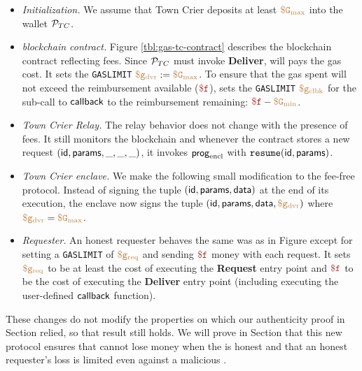 \begin{itemize}[leftmargin=1.5em]
  \item {\it Initialization.}
    We assume that Town Crier deposits at least $\tt {\color{brown} \$G_\text{max} }$ into the wallet ${\cal P}_{TC}$.

  \item {\it \tcs blockchain contract.}
    Figure \ref{tbl:gas-tc-contract} describes the \tcs blockchain contract reflecting fees.
    Since ${\cal P}_{TC}$ must invoke {\bf Deliver}, \tc will pays the gas cost.
    It sets the {\tt GASLIMIT} $\tt {\color{brown} \$g_\text{dvr} } := \tt {\color{brown} \$G_\text{max} }$.
    To ensure that the gas spent will not exceed the reimbursement available ($\fee$),
    \tcont sets the {\tt GASLIMIT} $\tt {\color{brown} \$g_\text{clbk} }$ for the sub-call to ${\sf callback}$ to the reimbursement remaining: $\fee - \constgasmin$.

  \item {\it Town Crier Relay.}
    The relay behavior does not change with the presence of fees.
    It still monitors the blockchain and whenever the contract \tcont stores a new request $({\sf id}, {\sf params}, \_, \_, \_)$,
    it invokes ${\sf prog}_{\textrm{encl}}$ with $\texttt{resume}({\sf id}, {\sf params})$.

  \item {\it Town Crier enclave.}
    We make the following small modification to the fee-free protocol.
    Instead of signing the tuple $({\sf id}, {\sf params}, {\sf data})$ at the end of its execution,
    the enclave now signs the tuple $({\sf id}, {\sf params}, {\sf data}, \tt {\color{brown} \$g_\text{dvr} })$ where $\tt {\color{brown} \$g_\text{dvr} } = \tt {\color{brown} \$G_\text{max} }$.

  \item {\it Requester.}
    An honest requester behaves the same was as in Figure  except for setting a {\tt GASLIMIT} of $\tt {\color{brown} \$g_\text{req} }$ and sending $\fee$ money with each request.
    It sets $\tt {\color{brown} \$g_\text{req} }$ to be at least the cost of executing the {\bf Request} entry point
    and $\fee$ to be the cost of executing the {\bf Deliver} entry point (including executing the user-defined ${\sf callback}$ function).
\end{itemize}

These changes do not modify the properties on which our authenticity proof in Section  relied, so that result still holds.
We will prove in Section  that this new protocol ensures that \tc cannot lose money when the \medname is honest
and that an honest requester's loss is limited even against a malicious \tc.


